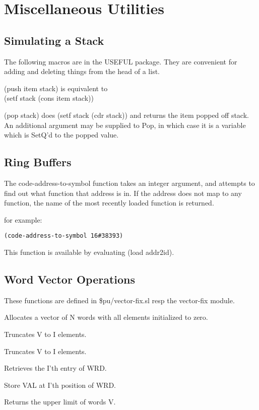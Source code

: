 \chapter*{Miscellaneous Utilities}

\section{Simulating a Stack}

  The  following  macros  are  in  the USEFUL package.  They are
convenient for adding and deleting things from  the  head  of  a
list.


{
(push item stack) is equivalent to\\
(setf stack (cons item stack))
}

{
(pop stack) does (setf stack (cdr stack)) and returns the item 
popped off stack. An additional argument may be supplied to Pop, in which 
case it is a variable which is SetQ'd to the popped value.
}

\section{Ring Buffers}

  The code-address-to-symbol function takes an integer argument,
and attempts to find out what function that address is  in.   If
the  address  does not map to any function, the name of the most
recently loaded function is returned.

{}
  for example:

\begin{verbatim}
(code-address-to-symbol 16#38393)
\end{verbatim}
  This function is available by evaluating (load addr2id).

\section{Word Vector Operations}

  These functions are defined in \$pu/vector-fix.sl
  resp the vector-fix module.


{    Allocates a vector of N words with all elements  initialized
    to zero.
}

{    Truncates V to I elements.
}

{    Truncates V to I elements.
}

{    Retrieves the I'th entry of WRD.
}

{    Store VAL at I'th position of WRD.
}

{    Returns the upper limit of words V.
}
